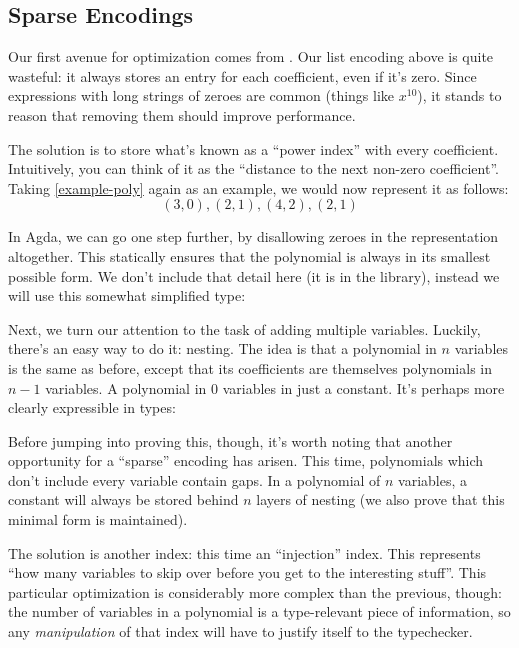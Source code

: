 \documentclass[acmsmall,review,anonymous]{acmart}\settopmatter{printfolios=true,printccs=false,printacmref=false}
\begin{document}
\subsection{Sparse Encodings}
Our first avenue for optimization comes from \citet{gregoire_proving_2005}. Our
list encoding above is quite wasteful: it always stores an entry for each
coefficient, even if it's zero. Since expressions with long strings of zeroes
are common (things like \(x^{10}\)), it stands to reason that removing them
should improve performance.

The solution is to store what's known as a ``power index'' with every
coefficient. Intuitively, you can think of it as the ``distance to the next
non-zero coefficient''. Taking \ref{example-poly} again as an example, we would
now represent it as follows:
\[ (3,0),(2,1),(4,2),(2,1) \]

In Agda, we can go one step further, by disallowing zeroes in the representation
altogether. This statically ensures that the polynomial is always in its
smallest possible form. We don't include that detail here (it is in the
library), instead we will use this somewhat simplified type:
\begin{center}
\end{center}

Next, we turn our attention to the task of adding multiple variables. Luckily,
there's an easy way to do it: nesting. The idea is that a polynomial in \(n\)
variables is the same as before, except that its coefficients are themselves
polynomials in \(n-1\) variables. A polynomial in \(0\) variables in just a
constant. It's perhaps more clearly expressible in types:
\begin{center}
\end{center}

Before jumping into proving this, though, it's worth noting that another
opportunity for a ``sparse'' encoding has arisen. This time, polynomials which
don't include every variable contain gaps. In a polynomial of \(n\) variables,
a constant will always be stored behind \(n\) layers of nesting (we also prove
that this minimal form is maintained).

The solution is another index: this time an ``injection'' index. This represents
``how many variables to skip over before you get to the interesting stuff''.
This particular optimization is considerably more complex than the previous,
though: the number of variables in a polynomial is a type-relevant piece of
information, so any \emph{manipulation} of that index will have to justify
itself to the typechecker.
\end{document}
